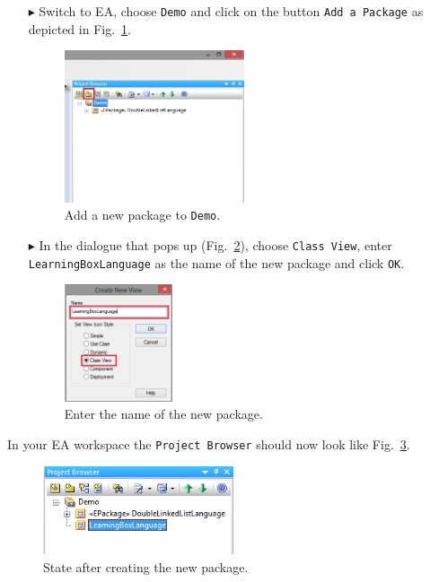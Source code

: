 \begin{enumerate}
\item[$\blacktriangleright$] Switch to EA, choose \texttt{Demo} and click on the button \texttt{Add a Package} as depicted in Fig.~\ref{fig:new_package}.

\begin{figure}[htbp]
	\centering
  \includegraphics[width=0.5\textwidth]{pics/memBoxBilder/memBox01.png}
	\caption{Add a new package to \texttt{Demo}.}
	\label{fig:new_package}
\end{figure}

\item[$\blacktriangleright$] In the dialogue that pops up (Fig.~\ref{fig:new_package_name}), choose \texttt{Class View}, enter \texttt{Learning\-Box\-Language} as the name of the new package and click \texttt{OK}.

\begin{figure}[htbp]
	\centering
    \includegraphics[width=0.3\textwidth]{pics/memBoxBilder/memBox02.png}
	\caption{Enter the name of the new package.}
	\label{fig:new_package_name}
\end{figure}
\end{enumerate}
\FloatBarrier

In your EA workspace the \texttt{Project Browser} should now look like Fig.~\ref{fig:new_package_completed}.
\begin{figure}[htbp]
	\centering
  \includegraphics[width=0.5\textwidth]{pics/memBoxBilder/memBox03.png}
	\caption{State after creating the new package.}
	\label{fig:new_package_completed}
\end{figure}
\FloatBarrier

